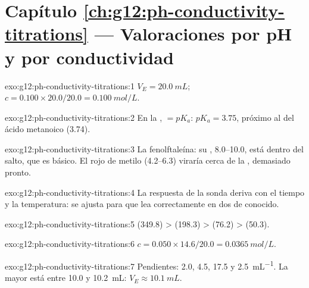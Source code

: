 \section*{Capítulo \ref{ch:g12:ph-conductivity-titrations} --- Valoraciones por pH y por conductividad}

\begin{solution}{exo:g12:ph-conductivity-titrations:1}
$V_E = \qty{20.0}{mL}$; $c = 0.100 \times 20.0 / 20.0 = \qty{0.100}{mol/L}$.
\end{solution}

\begin{solution}{exo:g12:ph-conductivity-titrations:2}
En la ,  $= pK_a$: $pK_a = 3.75$, próximo al del ácido
metanoico (3.74).
\end{solution}

\begin{solution}{exo:g12:ph-conductivity-titrations:3}
La fenolftaleína: su , 8.0--10.0, está dentro del salto,
que es básico. El rojo de metilo (4.2--6.3) viraría cerca de la
, demasiado pronto.
\end{solution}

\begin{solution}{exo:g12:ph-conductivity-titrations:4}
La respuesta de la sonda deriva con el tiempo y la temperatura: se ajusta
para que lea correctamente en dos  de  conocido.
\end{solution}

\begin{solution}{exo:g12:ph-conductivity-titrations:5}
 (349.8) >  (198.3) >  (76.2) >  (50.3).
\end{solution}

\begin{solution}{exo:g12:ph-conductivity-titrations:6}
$c = 0.050 \times 14.6 / 20.0 = \qty{0.0365}{mol/L}$.
\end{solution}

\begin{solution}{exo:g12:ph-conductivity-titrations:7}
Pendientes: 2.0, 4.5, 17.5 y \qty{2.5}{mL^{-1}}. La mayor está entre
10.0 y \qty{10.2}{mL}: $V_E \approx \qty{10.1}{mL}$.
\end{solution}

